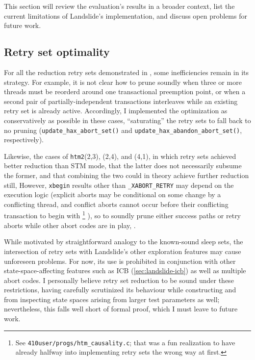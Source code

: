 This section will review %
the evaluation's results in a broader context,
list the current limitations of Landslide's implementation,
and discuss open problems for future work.

\subsection{Retry set optimality}

For all the reduction retry sets demonstrated in ,
some inefficiencies remain in its strategy.
For example, it is not clear how to prune soundly
when three or more threads must be reorderd around one transactional preemption point,
or when a second pair of partially-independent transactions interleaves while an existing retry set is already active.
Accordingly, I implemented the optimization as conservatively as possible in these cases,
``saturating'' the retry sets to fall back to no pruning
({\tt update\_hax\_abort\_set()} and
{\tt update\_hax\_abandon\_abort\_set()}, respectively).

Likewise, the cases of {\tt htm2}(2,3), (2,4), and (4,1),
in which retry sets achieved better reduction than STM mode,
 that the latter does not necessarily subsume the former,
and that combining the two could in theory achieve further reduction still,
However, {\tt xbegin} results other than {\tt \_XABORT\_RETRY}
may depend on the execution logic
(explicit aborts may be conditional on some change by a conflicting thread,
and conflict aborts cannot occur before their conflicting transaction to begin with%
\footnote{See {\tt 410user/progs/htm\_causality.c}; that was a fun realization to have
already halfway into implementing retry sets the wrong way at first.}%
),
so 
to soundly prune either success paths or retry aborts
while other abort codes are in play,
.

While
motivated by straightforward analogy to the known-sound sleep sets,
the intersection of retry sets with Landslide's other exploration features may cause unforeseen problems.
For now, its use is prohibited in conjunction with other state-space-affecting features
such as ICB (\cref{sec:landslide-icb})
as well as multiple abort codes.
I personally believe retry set reduction to be sound under these restrictions,
having carefully scrutinized its behaviour
while constructing 
and from inspecting state spaces arising from larger test parameters as well; %
nevertheless, this falls well short of formal proof, which I must leave to future work.

